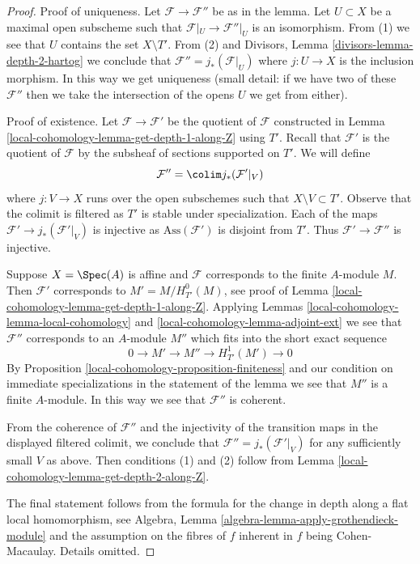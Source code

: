 \begin{proof}
Proof of uniqueness. Let $\mathcal{F} \to \mathcal{F}''$
be as in the lemma. Let $U \subset X$ be a maximal open
subscheme such that $\mathcal{F}|_U \to \mathcal{F}''|_U$
is an isomorphism. From (1) we see that $U$ contains the set $X \setminus T'$.
From (2) and Divisors, Lemma \ref{divisors-lemma-depth-2-hartog}
we conclude that $\mathcal{F}'' = j_*(\mathcal{F}|_U)$ where $j : U \to X$
is the inclusion morphism.
In this way we get uniqueness (small detail: if we have two
of these $\mathcal{F}''$ then we take the intersection of the opens $U$
we get from either).

\medskip\noindent
Proof of existence. Let $\mathcal{F} \to \mathcal{F}'$ be the quotient of
$\mathcal{F}$ constructed in Lemma \ref{local-cohomology-lemma-get-depth-1-along-Z} using $T'$.
Recall that $\mathcal{F}'$ is the quotient of $\mathcal{F}$
by the subsheaf of sections supported on $T'$. We will define
$$
\mathcal{F}'' = \colim j_*(\mathcal{F}'|_V)
$$
where $j : V \to X$ runs over the open subschemes such that
$X \setminus V \subset T'$. Observe that the colimit is filtered
as $T'$ is stable under specialization. Each of the
maps $\mathcal{F}' \to j_*(\mathcal{F}'|_V)$ is injective
as $\text{Ass}(\mathcal{F}')$ is disjoint from $T'$.
Thus $\mathcal{F}' \to \mathcal{F}''$ is injective.

\medskip\noindent
Suppose $X = \Spec(A)$ is affine and $\mathcal{F}$
corresponds to the finite $A$-module $M$. Then $\mathcal{F}'$
corresponds to $M' = M / H^0_{T'}(M)$, see proof of
Lemma \ref{local-cohomology-lemma-get-depth-1-along-Z}. Applying
Lemmas \ref{local-cohomology-lemma-local-cohomology} and \ref{local-cohomology-lemma-adjoint-ext}
we see that $\mathcal{F}''$ corresponds to an $A$-module
$M''$ which fits into the short exact sequence
$$
0 \to M' \to M'' \to H^1_{T'}(M') \to 0
$$
By Proposition \ref{local-cohomology-proposition-finiteness} and our condition
on immediate specializations in the statement of the lemma
we see that $M''$ is a finite $A$-module. In this way
we see that $\mathcal{F}''$ is coherent.

\medskip\noindent
From the coherence of $\mathcal{F}''$ and the injectivity of the transition
maps in the displayed filtered colimit, we conclude that
$\mathcal{F}'' = j_*(\mathcal{F}'|_V)$ for any sufficiently small $V$ as above.
Then conditions (1) and (2) follow from Lemma \ref{local-cohomology-lemma-get-depth-2-along-Z}.

\medskip\noindent
The final statement follows from the formula for the change in
depth along a flat local homomorphism, see
Algebra, Lemma \ref{algebra-lemma-apply-grothendieck-module}
and the assumption on the fibres of $f$ inherent in $f$ being
Cohen-Macaulay. Details omitted.
\end{proof}

